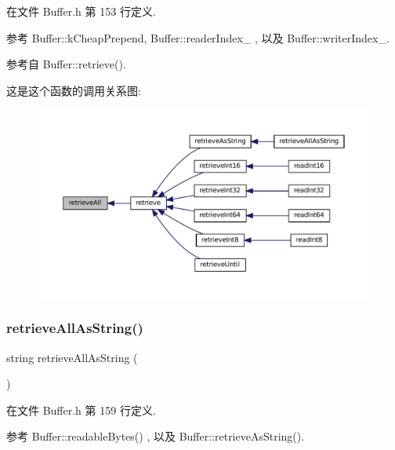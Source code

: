 在文件 Buffer.\+h 第 153 行定义.



参考 Buffer\+::k\+Cheap\+Prepend, Buffer\+::reader\+Index\+\_\+ , 以及 Buffer\+::writer\+Index\+\_\+.



参考自 Buffer\+::retrieve().

这是这个函数的调用关系图\+:
\nopagebreak
\begin{figure}[H]
\begin{center}
\leavevmode
\includegraphics[width=350pt]{classmuduo_1_1net_1_1Buffer_af505ce71f8935bcfaa932d304c295173_icgraph}
\end{center}
\end{figure}
\mbox{\label{classmuduo_1_1net_1_1Buffer_ac902667b575515cba5b54ddf3a5d10aa}} 
\subsubsection{\texorpdfstring{retrieve\+All\+As\+String()}{retrieveAllAsString()}}
{\footnotesize\ttfamily string retrieve\+All\+As\+String (\begin{DoxyParamCaption}{ }\end{DoxyParamCaption})\hspace{0.3cm}{\ttfamily [inline]}}



在文件 Buffer.\+h 第 159 行定义.



参考 Buffer\+::readable\+Bytes() , 以及 Buffer\+::retrieve\+As\+String().

